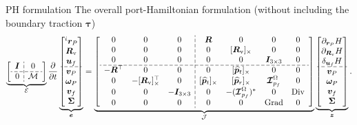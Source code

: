 \documentclass[aspectratio=169]{ISAE-Beamer}
\DeclareMathOperator*{\Grad}{Grad}
\DeclareMathOperator*{\Div}{Div}
\newcommand{\crmat}[1]{\ensuremath{[#1]_{\times}}}
\begin{document}
\begin{frame}{PH formulation}
The overall port-Hamiltonian formulation (without including the boundary traction $\bm{\tau}$)
\begin{equation*}
\setlength{\dashlinegap}{2pt}
\underbrace{
{\left[ \begin{array}{c:c}
\bm{I} & 0 \\
\hdashline
0 & {\mathcal{M}} \\
\end{array} \right]}
}_{{\mathcal{E}}}
\diffp{}{t}
\underbrace{\begin{bmatrix}
^i \bm{r}_P \\ \bm{R}_{\text{v}} \\ \bm{u}_f \\\hdashline  \bm{v}_P \\ \bm\omega_P  \\ \bm{v}_f  \\ \bm\Sigma \\
\end{bmatrix}}_{\bm{e}} = 
\underbrace{
{\left[ \begin{array}{ccc:cccc}
0 & 0 & 0 &  \bm{R} & 0 & 0 & 0 \\
0 & 0 & 0 & 0 & \crmat{\bm{R}_{\text{v}}} & 0 & 0 \\
0 & 0 & 0 & 0 & 0 & \bm{I}_{3\times 3} & 0  \\ 
\hdashline
-\bm{R}^\top & 0 & 0 & 0 & \crmat{\widehat{\bm{p}}_t} & 0 & 0 \\
0 & -\crmat{\bm{R}_{\text{v}}}^\top & 0 & \crmat{\widehat{\bm{p}}_t} & \crmat{\widehat{\bm{p}}_r} & \bm{\mathcal{I}}_{p_f}^\Omega & 0 \\
0 & 0 & -\bm{I}_{3\times 3} & 0 & -(\bm{\mathcal{I}}_{p_f}^\Omega)^* & 0 & \Div \\
0 & 0 & 0 & 0 & 0 & \Grad & 0 \\
\end{array} \right]}
}_{{\mathcal{J}}}
\underbrace{\begin{bmatrix}
\partial_{\bm{r}_P}H \\ \partial_{\bm{R}_\text{v}}H \\ \delta_{\bm{u}_f} H \\\hdashline  \bm{v}_P \\ \bm\omega_P  \\ \bm{v}_f  \\ \bm\Sigma \\
\end{bmatrix}}_{\bm{z}}.
\end{equation*} 

\end{frame}
\end{document}

